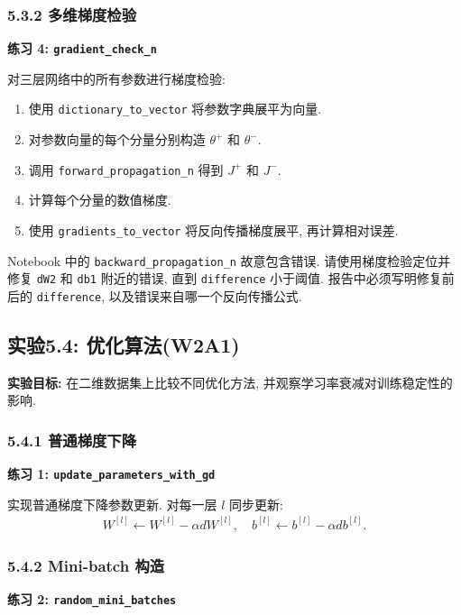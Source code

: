 \documentclass{../../nndlcourse}
\begin{document}
\subsubsection*{5.3.2 多维梯度检验}

\textbf{练习 4: \texttt{gradient\_check\_n}}

对三层网络中的所有参数进行梯度检验:
\begin{enumerate}
    \item 使用 \texttt{dictionary\_to\_vector} 将参数字典展平为向量.
    \item 对参数向量的每个分量分别构造 $\theta^+$ 和 $\theta^-$.
    \item 调用 \texttt{forward\_propagation\_n} 得到 $J^+$ 和 $J^-$.
    \item 计算每个分量的数值梯度.
    \item 使用 \texttt{gradients\_to\_vector} 将反向传播梯度展平, 再计算相对误差.
\end{enumerate}
Notebook 中的 \texttt{backward\_propagation\_n} 故意包含错误. 请使用梯度检验定位并修复 \texttt{dW2} 和 \texttt{db1} 附近的错误, 直到 \texttt{difference} 小于阈值. 报告中必须写明修复前后的 \texttt{difference}, 以及错误来自哪一个反向传播公式.

\subsection*{实验5.4: 优化算法(W2A1)}

\textbf{实验目标: }在二维数据集上比较不同优化方法, 并观察学习率衰减对训练稳定性的影响.

\subsubsection*{5.4.1 普通梯度下降}

\textbf{练习 1: \texttt{update\_parameters\_with\_gd}}

实现普通梯度下降参数更新. 对每一层 $l$ 同步更新:
\begin{align}
    W^{[l]} \leftarrow W^{[l]}-\alpha dW^{[l]},
    \quad
    b^{[l]} \leftarrow b^{[l]}-\alpha db^{[l]}.
\end{align}

\subsubsection*{5.4.2 Mini-batch 构造}

\textbf{练习 2: \texttt{random\_mini\_batches}}
\end{document}
